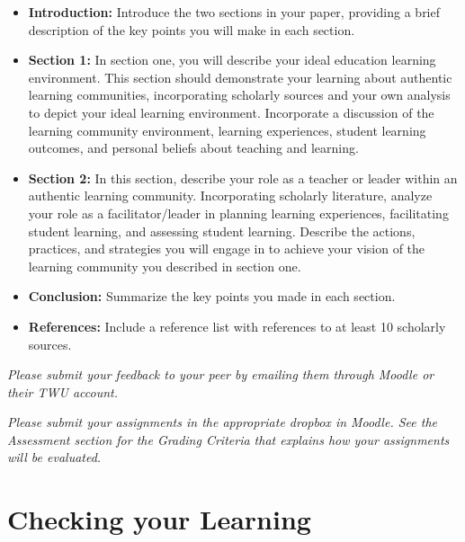 \documentclass[
]{book}
\providecommand{\tightlist}{%
  \setlength{\itemsep}{0pt}\setlength{\parskip}{0pt}}
\begin{document}
\begin{assessment}
\begin{itemize}
\tightlist
\item
  \textbf{Introduction:} Introduce the two sections in your paper, providing a brief description of the key points you will make in each section.\\
\item
  \textbf{Section 1:} In section one, you will describe your ideal education learning environment. This section should demonstrate your learning about authentic learning communities, incorporating scholarly sources and your own analysis to depict your ideal learning environment. Incorporate a discussion of the learning community environment, learning experiences, student learning outcomes, and personal beliefs about teaching and learning.\\
\item
  \textbf{Section 2:} In this section, describe your role as a teacher or leader within an authentic learning community. Incorporating scholarly literature, analyze your role as a facilitator/leader in planning learning experiences, facilitating student learning, and assessing student learning. Describe the actions, practices, and strategies you will engage in to achieve your vision of the learning community you described in section one.\\
\item
  \textbf{Conclusion:} Summarize the key points you made in each section.\\
\item
  \textbf{References:} Include a reference list with references to at least 10 scholarly sources.
\end{itemize}

\emph{Please submit your feedback to your peer by emailing them through Moodle or their TWU account.}
\end{assessment}

\begin{caution}
\emph{Please submit your assignments in the appropriate dropbox in Moodle. See the Assessment section for the Grading Criteria that explains how your assignments will be evaluated.}
\end{caution}

\hypertarget{checking-your-learning-8}{%
\section*{Checking your Learning}\label{checking-your-learning-8}}
\end{document}

